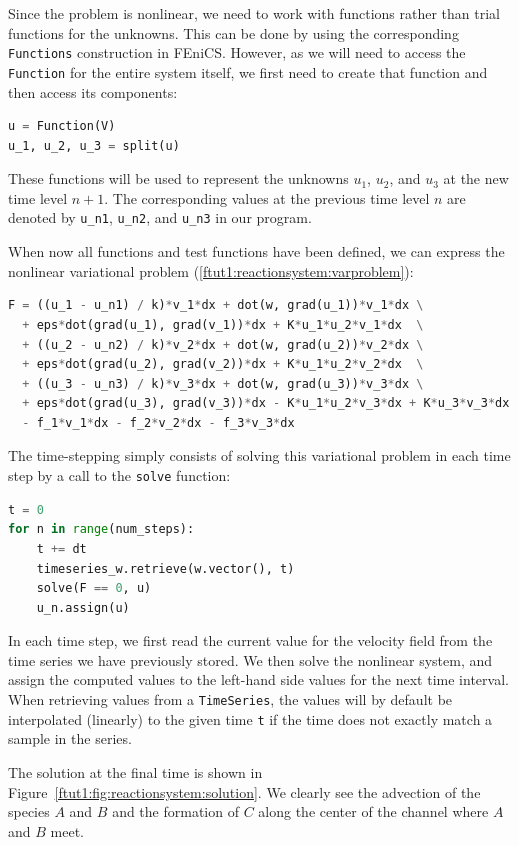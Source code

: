 \documentclass[graybox,envcountchap,sectrefs,final]{svmonodo}
\begin{document}
Since the problem is nonlinear, we need to work with functions rather
than trial functions for the unknowns. This can be done by using the
corresponding \texttt{Functions} construction in FEniCS. However, as we will
need to access the \texttt{Function} for the entire system itself, we first
need to create that function and then access its components:

\begin{lstlisting}[language=Python,style=graycolor]
u = Function(V)
u_1, u_2, u_3 = split(u)
\end{lstlisting}
These functions will be used to represent the unknowns $u_1$, $u_2$, and $u_3$
at the new time level $n+1$. The corresponding values at the previous
time level $n$ are denoted by \Verb!u_n1!, \Verb!u_n2!, and \Verb!u_n3! in our program.

When now all functions and test functions have been defined, we can
express the nonlinear variational problem
(\ref{ftut1:reactionsystem:varproblem}):

\begin{lstlisting}[language=Python,style=graycolor]
F = ((u_1 - u_n1) / k)*v_1*dx + dot(w, grad(u_1))*v_1*dx \
  + eps*dot(grad(u_1), grad(v_1))*dx + K*u_1*u_2*v_1*dx  \
  + ((u_2 - u_n2) / k)*v_2*dx + dot(w, grad(u_2))*v_2*dx \
  + eps*dot(grad(u_2), grad(v_2))*dx + K*u_1*u_2*v_2*dx  \
  + ((u_3 - u_n3) / k)*v_3*dx + dot(w, grad(u_3))*v_3*dx \
  + eps*dot(grad(u_3), grad(v_3))*dx - K*u_1*u_2*v_3*dx + K*u_3*v_3*dx \
  - f_1*v_1*dx - f_2*v_2*dx - f_3*v_3*dx
\end{lstlisting}

The time-stepping simply consists of solving this variational problem
in each time step by a call to the \texttt{solve} function:

\begin{lstlisting}[language=Python,style=graycolor]
t = 0
for n in range(num_steps):
    t += dt
    timeseries_w.retrieve(w.vector(), t)
    solve(F == 0, u)
    u_n.assign(u)
\end{lstlisting}
In each time step, we first read the current value for the velocity
field from the time series we have previously stored. We then solve
the nonlinear system, and assign the computed values to the left-hand
side values for the next time interval. When retrieving values from a
\texttt{TimeSeries}, the values will by default be interpolated (linearly) to
the given time \texttt{t} if the time does not exactly match a sample in the
series.

The solution at the final time is shown in Figure~\ref{ftut1:fig:reactionsystem:solution}. We
clearly see the advection of the species $A$ and $B$ and the formation
of $C$ along the center of the channel where $A$ and $B$ meet.
\end{document}
